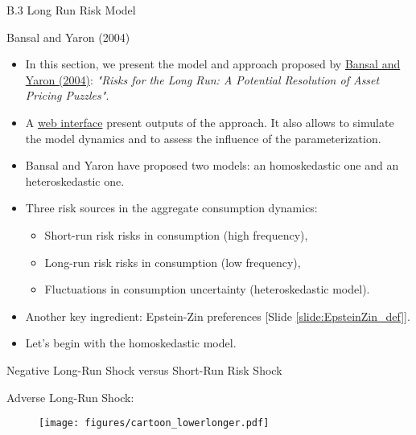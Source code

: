 \begin{frame}{}
\begin{large}
\begin{center}
B.3 Long Run Risk Model
\end{center}
\end{large}
\end{frame}


\begin{frame}{Bansal and Yaron (2004)}\label{slide:BY2004}
\begin{footnotesize}
\begin{itemize}
	\item In this section, we present the model and approach proposed by \href{http://onlinelibrary.wiley.com/doi/10.1111/j.1540-6261.2004.00670.x/abstract}{Bansal and Yaron (2004)}: \textit{"Risks for the Long Run: A Potential Resolution of Asset Pricing Puzzles"}.
	\item A \href{https://jrenne.shinyapps.io/LRRModels}{web interface} present outputs of the approach. It also allows to simulate the model dynamics and to assess the influence of the parameterization.
	\item Bansal and Yaron have proposed two models: an homoskedastic one and an heteroskedastic one.
	\item Three risk sources in the aggregate consumption dynamics:
	\begin{itemize}
		\item Short-run risk risks in consumption (high frequency),
		\item Long-run risk risks in consumption (low frequency),
		\item Fluctuations in consumption uncertainty (heteroskedastic model).
	\end{itemize}
	\item Another key ingredient: Epstein-Zin preferences [Slide \ref{slide:EpsteinZin_def}].
	
	\vspace{.3cm}
	\item Let's begin with the homoskedastic model.
\end{itemize}
\end{footnotesize}
\end{frame}



\begin{frame}{Negative Long-Run Shock versus Short-Run Risk Shock}
\begin{center}
Adverse Long-Run Shock:
\end{center}
		\begin{figure}
			\texttt{[image: figures/cartoon\_lowerlonger.pdf]}
		\end{figure}
\end{frame}


